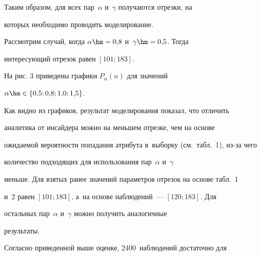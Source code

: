 




\renewcommand{\figurename}{\protect\bf Рис.}


\renewcommand{\tablename}{\protect\bf Таблица}





\setcounter{figure}{2}


\addtocounter{table}{1}





Таким образом, для всех пар~$\alpha$ и~$\gamma$ получаются отрезки, на 


которых необходимо проводить моделирование.


  


  Рассмотрим случай, когда $\alpha\hm=0{,}8$ и~$\gamma\hm= 0{,}5$. Тогда 


интересующий отрезок равен $[101; 183]$.


  


  На рис. 3 приведены графики $P_\alpha(n)$ для значений 


  $\alpha\hm\in \{0{,}5; 0{,}8; 1{,}0; 1{,}5\}$.











  Как видно из графиков, результат моделирования показал, что отличить 


аналитика от инсайдера можно на меньшем отрезке, чем на основе 


ожидаемой вероятности попадания атрибута в~выборку (см.\ табл.~1), из-за чего 


количество подходящих для использования пар~$\alpha$ и~$\gamma$ 


меньше. Для взятых ранее значений параметров отрезок на основе табл.~1 


и~2 равен $[101; 183]$, а~на основе наблюдений~--- $[120; 183]$. Для 


остальных пар~$\alpha$ и~$\gamma$ можно получить аналогичные 


результаты.








  Согласно приведенной выше оценке, 2400~наблюдений достаточно для 


